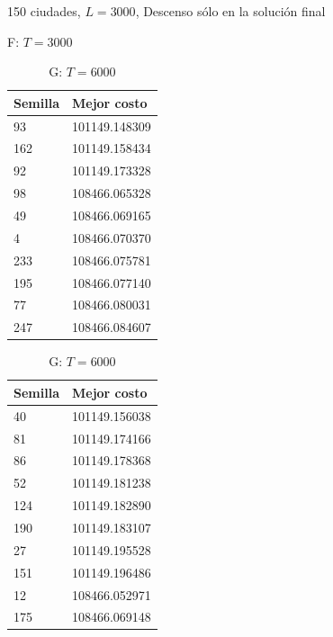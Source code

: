 \documentclass{article}
\begin{document}
  \begin{table}[!htbp]
    \caption{150 ciudades, 
             $L=3000$, 
             Descenso sólo en la solución final}
    \begin{minipage}{.5\linewidth}
      \caption{F: $T= 3000$}
      \centering
      \begin{tabular}{l|l}
        Semilla & Mejor costo \\
        \hline
        93      & 101149.148309 \\
        \hline
        162     & 101149.158434 \\
        \hline
        92      & 101149.173328 \\
        \hline
        98      & 108466.065328 \\
        \hline
        49      & 108466.069165 \\
        \hline
        4       & 108466.070370 \\
        \hline
        233     & 108466.075781 \\
        \hline
        195     & 108466.077140 \\
        \hline
        77      & 108466.080031 \\
        \hline
        247     & 108466.084607 \\
      \end{tabular}
    \end{minipage}%
    \begin{minipage}{.5\linewidth}
      \centering
      \caption{G: $T=6000$}
      \begin{tabular}{l|l}
        Semilla & Mejor costo \\
        \hline
        40      & 101149.156038 \\
        \hline
        81      & 101149.174166 \\
        \hline
        86      & 101149.178368 \\
        \hline
        52      & 101149.181238 \\
        \hline
        124     & 101149.182890 \\
        \hline
        190     & 101149.183107 \\
        \hline
        27      & 101149.195528 \\
        \hline
        151     & 101149.196486 \\
        \hline
        12      & 108466.052971 \\
        \hline
        175     & 108466.069148 \\

\end{tabular}
\end{minipage}
\end{table}
\end{document}
